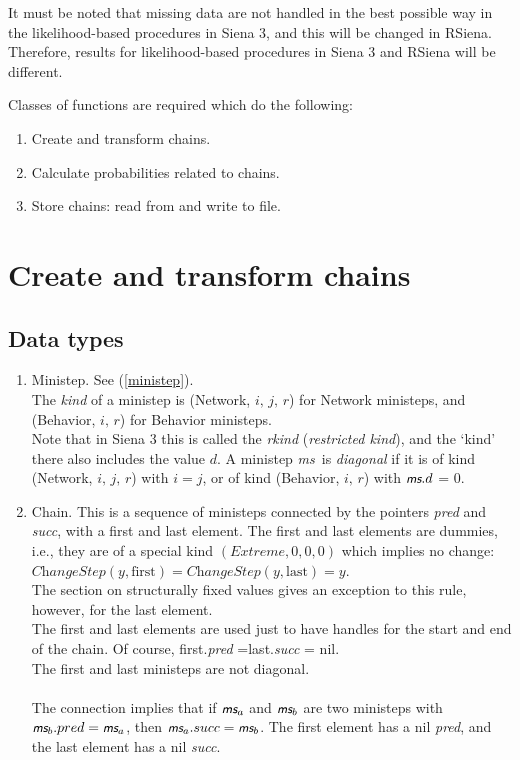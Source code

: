 \documentclass[a4paper,fleqn,12pt]{article}
\newcommand{\ms}{\textsl{\textsf{\small ms}}} %
\begin{document}
It must be noted that missing data are not handled in the best possible way
in the likelihood-based procedures in Siena 3, and this will be changed
in RSiena. Therefore, results for likelihood-based procedures in Siena 3 and RSiena
will be different.

Classes of functions are required which do the following:
\begin{enumerate}
\item Create and transform chains.
\item Calculate probabilities related to chains.
\item Store chains: read from and write to file.
\end{enumerate}

\section{Create and transform chains}

\subsection{Data types}
\begin{enumerate}
\item  Ministep. See (\ref{ministep}).\\
       The \emph{kind} of a ministep is (Network, $i,\, j,\, r$) for Network ministeps,
       and (Behavior, $i, \, r$) for Behavior ministeps.\\
       Note that in Siena 3 this is called the \emph{rkind} (\emph{restricted kind}),
       and the `kind' there also includes the value $d$.
       A ministep \ms \ is \emph{diagonal} if it is of kind (Network, $i,\, j,\, r$)
       with $i = j$, or of kind (Behavior, $i, \, r$) with $\ms.d$ = 0.
\item Chain. This is a sequence of ministeps connected by the pointers
      \textit{pred} and \textit{succ},
      with a first and last element.
      The first and last elements are dummies, i.e., they are of a special kind
      $(\textit{Extreme}, 0, 0, 0)$ which implies no change:\\
      $\textit{ChangeStep}(y,\text{first}) = \textit{ChangeStep}(y,\text{last}) = y$.\\
      The section on structurally fixed values gives an exception to this rule,
      however, for the last element.\\
      The first and last elements are used just to have handles
      for the start and end of the chain. Of course, first.\textit{pred} =last.\textit{succ} = nil.\\
      The first and last ministeps are not diagonal.\\
      \\
      The connection implies that if $\ms_a$ and $\ms_b$ are two ministeps
      with \\
      $\ms_b.pred = \ms_a$, then $\ms_a.succ = \ms_b$.
      The first element has a nil \textit{pred}, and the last element
      has a nil \textit{succ}.
\end{enumerate}
\end{document}
